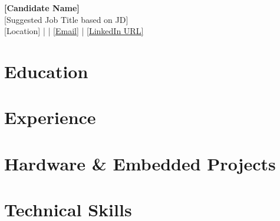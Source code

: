 \documentclass[letterpaper,11pt]{article}
\begin{document}
\begin{center}
  {\LARGE \textbf{[Candidate Name]}}\\
  {\normalsize [Suggested Job Title based on JD]}\\
  \small
  [Location]
  \quad | \quad
  [Phone]
  \quad | \quad
  \href{mailto:[Email]}{[Email]}
  \quad | \quad
  \href{[LinkedIn URL]}{[LinkedIn URL]}
\end{center}
\vspace{-13pt}

\section*{Education}

\section*{Experience}

\section*{Hardware \& Embedded Projects}

\section*{Technical Skills}
\end{document}
